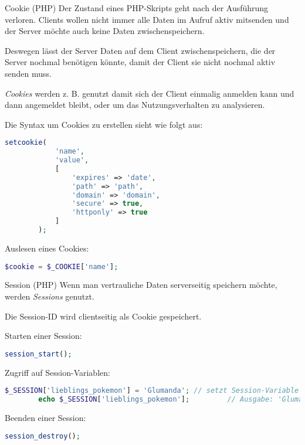 \begin{defi}{Cookie (PHP)}
    Der Zustand eines PHP-Skripts geht nach der Ausführung verloren.
    Clients wollen nicht immer alle Daten im Aufruf aktiv mitsenden und der Server möchte auch keine Daten zwischenspeichern.

    Deswegen lässt der Server Daten auf dem Client zwischenspeichern, die der Server nochmal benötigen könnte, damit der Client sie nicht nochmal aktiv senden muss.

    \emph{Cookies} werden z. B. genutzt damit sich der Client einmalig anmelden kann und dann angemeldet bleibt, oder um das Nutzungsverhalten zu analysieren.

    Die Syntax um Cookies zu erstellen sieht wie folgt aus:
    \begin{lstlisting}[language=php]    
        setcookie(
            'name',
            'value',
            [
                'expires' => 'date',
                'path' => 'path',
                'domain' => 'domain',
                'secure' => true,
                'httponly' => true
            ]
        );
    \end{lstlisting}

    Auslesen eines Cookies:
    \begin{lstlisting}[language=php]
        $cookie = $_COOKIE['name'];
    \end{lstlisting}
\end{defi}

\begin{defi}{Session (PHP)}
    Wenn man vertrauliche Daten serverseitig speichern möchte, werden \emph{Sessions} genutzt.

    Die Session-ID wird clientseitig als Cookie gespeichert.

    Starten einer Session:
    \begin{lstlisting}[language=php]
        session_start();
    \end{lstlisting}

    Zugriff auf Session-Variablen:
    \begin{lstlisting}[language=php]
        $_SESSION['lieblings_pokemon'] = 'Glumanda'; // setzt Session-Variable 'lieblings_pokemon'
        echo $_SESSION['lieblings_pokemon'];         // Ausgabe: 'Glumanda'
    \end{lstlisting}

    Beenden einer Session:
    \begin{lstlisting}[language=php]
        session_destroy();
    \end{lstlisting}
\end{defi}